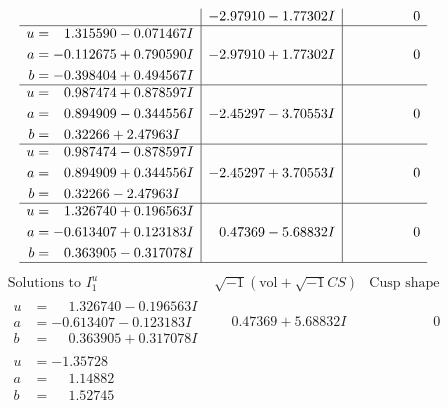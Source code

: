 \documentclass[1p]{elsarticle_modified}
\theoremstyle{definition}
\newcommand{\I}{\sqrt{-1}}
\begin{document}
$$\begin{array}{c|c|c}
 & -2.97910 - 1.77302 I & \phantom{-0.000000 } 0 \\ \hline\begin{aligned}
u &= \phantom{-}1.315590 - 0.071467 I \\
a &= -0.112675 + 0.790590 I \\
b &= -0.398404 + 0.494567 I\end{aligned}
 & -2.97910 + 1.77302 I & \phantom{-0.000000 } 0 \\ \hline\begin{aligned}
u &= \phantom{-}0.987474 + 0.878597 I \\
a &= \phantom{-}0.894909 - 0.344556 I \\
b &= \phantom{-}0.32266 + 2.47963 I\end{aligned}
 & -2.45297 - 3.70553 I & \phantom{-0.000000 } 0 \\ \hline\begin{aligned}
u &= \phantom{-}0.987474 - 0.878597 I \\
a &= \phantom{-}0.894909 + 0.344556 I \\
b &= \phantom{-}0.32266 - 2.47963 I\end{aligned}
 & -2.45297 + 3.70553 I & \phantom{-0.000000 } 0 \\ \hline\begin{aligned}
u &= \phantom{-}1.326740 + 0.196563 I \\
a &= -0.613407 + 0.123183 I \\
b &= \phantom{-}0.363905 - 0.317078 I\end{aligned}
 & \phantom{-}0.47369 - 5.68832 I & \phantom{-0.000000 } 0\\
 \hline 
 \end{array}$$\newpage$$\begin{array}{c|c|c}  
\text{Solutions to }I^u_{1}& \I (\text{vol} + \sqrt{-1}CS) & \text{Cusp shape}\\
 \hline 
\begin{aligned}
u &= \phantom{-}1.326740 - 0.196563 I \\
a &= -0.613407 - 0.123183 I \\
b &= \phantom{-}0.363905 + 0.317078 I\end{aligned}
 & \phantom{-}0.47369 + 5.68832 I & \phantom{-0.000000 } 0 \\ \hline\begin{aligned}
u &= -1.35728\phantom{ +0.000000I} \\
a &= \phantom{-}1.14882\phantom{ +0.000000I} \\
b &= \phantom{-}1.52745\phantom{ +0.000000I}\end{aligned}

\end{array}$$
\end{document}
